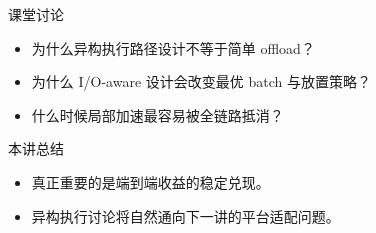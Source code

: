 

\begin{frame}{课堂讨论}
  \begin{itemize}
    \item 为什么异构执行路径设计不等于简单 offload？
    \item 为什么 I/O-aware 设计会改变最优 batch 与放置策略？
    \item 什么时候局部加速最容易被全链路抵消？
  \end{itemize}
\end{frame}

\begin{frame}{本讲总结}
  \begin{itemize}
    \item 真正重要的是端到端收益的稳定兑现。
    \item 异构执行讨论将自然通向下一讲的平台适配问题。
  \end{itemize}
\end{frame}

